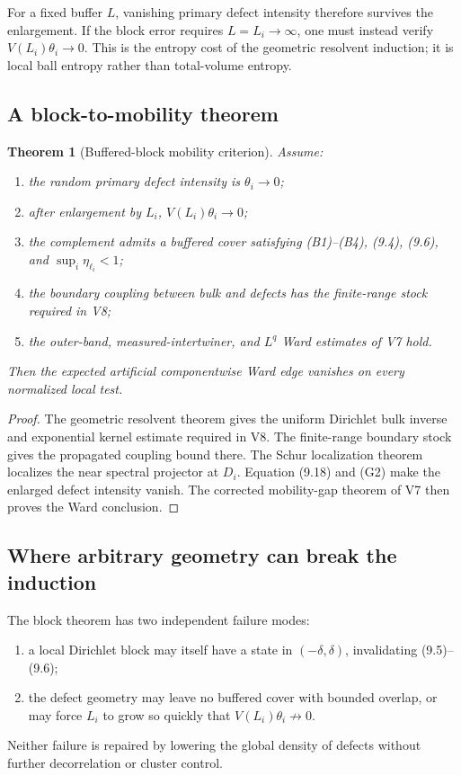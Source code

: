 \documentclass[11pt]{article}
\newtheorem{theorem}{Theorem}[section]
\begin{document}
For a fixed buffer \(L\), vanishing primary defect intensity therefore
survives the enlargement.  If the block error requires
\(L=L_i\to\infty\), one must instead verify
\(V(L_i)\theta_i\to0\).  This is the entropy cost of the geometric
resolvent induction; it is local ball entropy rather than total-volume
entropy.

\subsection{A block-to-mobility theorem}

\begin{theorem}[Buffered-block mobility criterion]
\label{thm:v11v9-block-mobility}
Assume:
\begin{enumerate}[label=\textnormal{(G\arabic*)}]
\item the random primary defect intensity is \(\theta_i\to0\);
\item after enlargement by \(L_i\),
\(V(L_i)\theta_i\to0\);
\item the complement admits a buffered cover satisfying
(B1)--(B4), (9.4), (9.6), and
\(\sup_i\eta_{\ell_i}<1\);
\item the boundary coupling between bulk and defects has the finite-range
stock required in V8;
\item the outer-band, measured-intertwiner, and \(L^q\) Ward estimates of
V7 hold.
\end{enumerate}
Then the expected artificial componentwise Ward edge vanishes on every
normalized local test.
\end{theorem}

\begin{proof}
The geometric resolvent theorem gives the uniform Dirichlet bulk inverse
and exponential kernel estimate required in V8.  The finite-range boundary
stock gives the propagated coupling bound there.  The Schur localization
theorem localizes the near spectral projector at \(D_i\).
Equation (9.18) and (G2) make the enlarged defect intensity vanish.
The corrected mobility-gap theorem of V7 then proves the Ward conclusion.
\end{proof}

\subsection{Where arbitrary geometry can break the induction}

The block theorem has two independent failure modes:
\begin{enumerate}[label=\textnormal{(\alph*)}]
\item a local Dirichlet block may itself have a state in
\((-\delta,\delta)\), invalidating (9.5)--(9.6);
\item the defect geometry may leave no buffered cover with bounded overlap,
or may force \(L_i\) to grow so quickly that \(V(L_i)\theta_i\not\to0\).
\end{enumerate}
Neither failure is repaired by lowering the global density of defects
without further decorrelation or cluster control.
\end{document}
